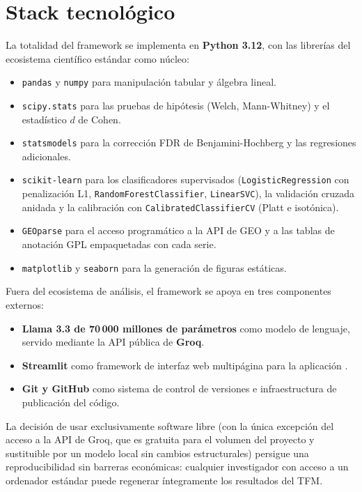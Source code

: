 \section{Stack tecnológico}
\label{sec:dev_stack}

La totalidad del framework se implementa en \textbf{Python 3.12}, con
las librerías del ecosistema científico estándar como núcleo:

\begin{itemize}[leftmargin=1.2em]
  \item \texttt{pandas} y \texttt{numpy} para manipulación tabular y
  álgebra lineal.
  \item \texttt{scipy.stats} para las pruebas de hipótesis (Welch,
  Mann-Whitney) y el estadístico $d$ de Cohen.
  \item \texttt{statsmodels} para la corrección FDR de
  Benjamini-Hochberg y las regresiones adicionales.
  \item \texttt{scikit-learn} para los clasificadores supervisados
  (\texttt{LogisticRegression} con penalización L1, \texttt{RandomForestClassifier},
  \texttt{LinearSVC}), la validación cruzada anidada y la calibración
  con \texttt{CalibratedClassifierCV} (Platt e isotónica).
  \item \texttt{GEOparse} para el acceso programático a la API de GEO
  y a las tablas de anotación GPL empaquetadas con cada serie.
  \item \texttt{matplotlib} y \texttt{seaborn} para la generación de
  figuras estáticas.
\end{itemize}

Fuera del ecosistema de análisis, el framework se apoya en tres
componentes externos:

\begin{itemize}[leftmargin=1.2em]
  \item \textbf{Llama 3.3 de 70\,000 millones de parámetros} como
  modelo de lenguaje, servido mediante la API pública de \textbf{Groq}.
  \item \textbf{Streamlit} como framework de interfaz web
  multipágina para la aplicación \framework.
  \item \textbf{Git y GitHub} como sistema de control de versiones e
  infraestructura de publicación del código.
\end{itemize}

La decisión de usar exclusivamente software libre (con la única
excepción del acceso a la API de Groq, que es gratuita para el volumen
del proyecto y sustituible por un modelo local sin cambios estructurales)
persigue una reproducibilidad sin barreras económicas: cualquier
investigador con acceso a un ordenador estándar puede regenerar
íntegramente los resultados del TFM.

